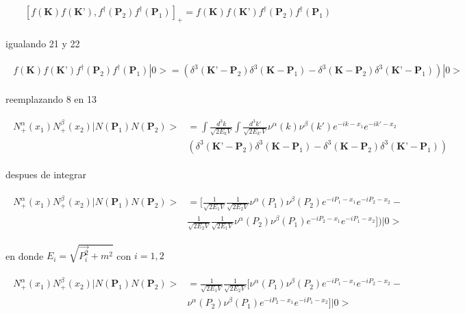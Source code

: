 \begin{gather}
\begin{split}
[f(\textbf{K})f(\textbf{K'}),f^{\dagger}(\textbf{P}_2)f^{\dagger}(\textbf{P}_1)]_{+}=f(\textbf{K})f(\textbf{K'})f^{\dagger}(\textbf{P}_2)f^{\dagger}(\textbf{P}_1)
\end{split}
\end{gather}

igualando 21 y 22

\begin{gather}
\begin{split}
f(\textbf{K})f(\textbf{K'})f^{\dagger}(\textbf{P}_2)f^{\dagger}(\textbf{P}_1)|0>=(\delta^{3}(\textbf{K'}-\textbf{P}_2)\delta^{3}(\textbf{K}-\textbf{P}_1)-\delta^{3}(\textbf{K}-\textbf{P}_2)\delta^{3}(\textbf{K'}-\textbf{P}_1))|0>
\end{split} 
\end{gather}

reemplazando 8 en 13

\begin{gather}
\begin{split}
{N}^{\alpha}_{+}(x_1){N}^{\beta}_{+}(x_2)|{N}(\textbf{P}_1){N}(\textbf{P}_2)>&=\int \frac{{d}^{3}k}{\sqrt{2E_{k}V}}\int \frac{{d}^{3}k'}{\sqrt{2E_{k'}V}}\nu^{\alpha}(k)\nu^{\beta}(k')e^{-ik-x_{1}}e^{-ik'-x_{2}}\\&(\delta^{3}(\textbf{K'}-\textbf{P}_2)\delta^{3}(\textbf{K}-\textbf{P}_1)-\delta^{3}(\textbf{K}-\textbf{P}_2)\delta^{3}(\textbf{K'}-\textbf{P}_1))
\end{split}
\end{gather}

despues de integrar 

\begin{gather}
\begin{split}
{N}^{\alpha}_{+}(x_1){N}^{\beta}_{+}(x_2)|{N}(\textbf{P}_1){N}(\textbf{P}_2)>&=[\frac{1}{\sqrt{2E_{1}V}}\frac{1}{\sqrt{2E_{2}V}}\nu^{\alpha}({P}_1)\nu^{\beta}({P}_{2})e^{-i{P}_{1}-x_{1}}e^{-iP_{2}-x_{2}}-\\& \frac{1}{\sqrt{2E_{2}V}}\frac{1}{\sqrt{2E_{1}V}}\nu^{\alpha}({P}_2)\nu^{\beta}({P}_{1})e^{-i{P}_{2}-x_{1}}e^{-iP_{1}-x_{2}}])|0>
\end{split}
\end{gather}

en donde $E_{i}=\sqrt{\vec{P_i^2}+m^2}$ con $i=1,2$

\begin{gather}
\begin{split}
{N}^{\alpha}_{+}(x_1){N}^{\beta}_{+}(x_2)|{N}(\textbf{P}_1){N}(\textbf{P}_2)>&=\frac{1}{\sqrt{2E_{1}V}}\frac{1}{\sqrt{2E_{2}V}}[\nu^{\alpha}({P}_1)\nu^{\beta}({P}_2)e^{-i{P}_{1}-x_{1}}e^{-iP_{2}-x_{2}}-\\&\nu^{\alpha}({P}_2)\nu^{\beta}({P}_1)e^{-i{P}_{2}-x_{1}}e^{-iP_{1}-x_{2}}]|0>
\end{split}
\end{gather}

